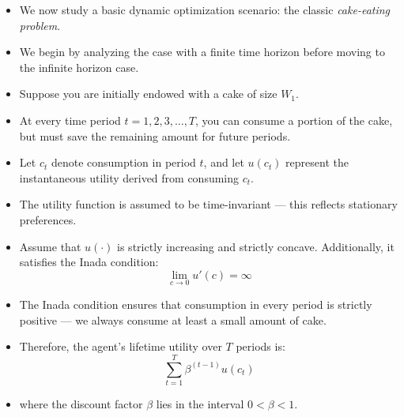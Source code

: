 \documentclass[12pt]{article}
\begin{document}
\begin{itemize}
    \item We now study a basic dynamic optimization scenario: the classic \textit{cake-eating problem}.
    
    \item We begin by analyzing the case with a finite time horizon before moving to the infinite horizon case.
    
    \item Suppose you are initially endowed with a cake of size \( W_1 \).
    
    \item At every time period \( t = 1, 2, 3, \dots, T \), you can consume a portion of the cake, but must save the remaining amount for future periods.
    
    \item Let \( c_t \) denote consumption in period \( t \), and let \( u(c_t) \) represent the instantaneous utility derived from consuming \( c_t \).
    
    \item The utility function is assumed to be time-invariant — this reflects stationary preferences.
    
    \item Assume that \( u(\cdot) \) is strictly increasing and strictly concave. Additionally, it satisfies the Inada condition:
    \[
    \lim_{c \to 0} u'(c) = \infty
    \]
    
    \item The Inada condition ensures that consumption in every period is strictly positive — we always consume at least a small amount of cake.
    
    \item Therefore, the agent’s lifetime utility over \( T \) periods is:
    \[
    \sum_{t=1}^{T} \beta^{(t - 1)} u(c_t)
    \]
    
    \item where the discount factor \( \beta \) lies in the interval \( 0 < \beta < 1 \).
\end{itemize}
\end{document}
